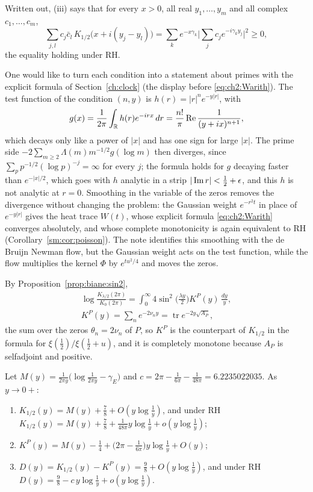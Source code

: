 Written out, (iii) says that for every $x>0$, all real $y_1,\dots,y_m$ and all complex $c_1,\dots,c_m$,
\[
\sum_{j,l}c_j\bar c_l\,K_{1/2}\big(x+i(y_j-y_l)\big)=\sum_ke^{-x\gamma_k}\Big|\sum_jc_je^{-i\gamma_ky_j}\Big|^2\ge0,
\]
the equality holding under RH.

One would like to turn each condition into a statement about primes with the explicit formula of Section~\ref{ch:clock} (the display before \eqref{eq:ch2:Warith}). The test function of the condition $(n,y)$ is $h(r)=|r|^ne^{-y|r|}$, with
\[
g(x)=\frac1{2\pi}\int_{\mathbb{R}}h(r)e^{-irx}\,dr=\frac{n!}\pi\operatorname{Re}\frac1{(y+ix)^{n+1}},
\]
which decays only like a power of $|x|$ and has one sign for large $|x|$. The prime side $-2\sum_{m\ge2}\Lambda(m)m^{-1/2}g(\log m)$ then diverges, since $\sum_pp^{-1/2}(\log p)^{-j}=\infty$ for every $j$; the formula holds for $g$ decaying faster than $e^{-|x|/2}$, which goes with $h$ analytic in a strip $|\operatorname{Im} r|<\frac12+\epsilon$, and this $h$ is not analytic at $r=0$. Smoothing in the variable of the zeros removes the divergence without changing the problem: the Gaussian weight $e^{-r^2t}$ in place of $e^{-y|r|}$ gives the heat trace $W(t)$, whose explicit formula \eqref{eq:ch2:Warith} converges absolutely, and whose complete monotonicity is again equivalent to RH (Corollary~\ref{sm:cor:poisson}). The note \cite{P26bia} identifies this smoothing with the de Bruijn Newman flow, but the Gaussian weight acts on the test function, while the flow multiplies the kernel $\Phi$ by $e^{tu^2/4}$ and moves the zeros.

By Proposition~\ref{prop:biane:sin2},
\begin{gather*}
\log\frac{K_{\lambda/2}(2\pi)}{K_0(2\pi)}=\int_0^\infty4\sin^2\Big(\frac{\lambda y}2\Big)K^P(y)\,\frac{dy}y,\\
K^P(y)=\sum_ne^{-2\nu_ny}=\operatorname{tr}e^{-2y\sqrt{A_P}},
\end{gather*}
the sum over the zeros $\theta_n=2\nu_n$ of $P$, so $K^P$ is the counterpart of $K_{1/2}$ in the formula for $\xi(\frac12)/\xi(\frac12+u)$, and it is completely monotone because $A_P$ is selfadjoint and positive.

\begin{proposition}\label{prop:biane:traces}
Let $M(y)=\frac1{2\pi y}\big(\log\frac1{2\pi y}-\gamma_E\big)$ and $c=2\pi-\frac1{6\pi}-\frac1{48\pi}=6.2235022035$. As $y\to0+$:
\begin{enumerate}
\item[(i)] $K_{1/2}(y)=M(y)+\frac78+O(y\log\frac1y)$, and under RH $K_{1/2}(y)=M(y)+\frac78+\frac1{48\pi}y\log\frac1y+o(y\log\frac1y)$;
\item[(ii)] $K^P(y)=M(y)-\frac14+\big(2\pi-\frac1{6\pi}\big)y\log\frac1y+O(y)$;
\item[(iii)] $D(y)=K_{1/2}(y)-K^P(y)=\frac98+O(y\log\frac1y)$, and under RH $D(y)=\frac98-c\,y\log\frac1y+o(y\log\frac1y)$.
\end{enumerate}
\end{proposition}


